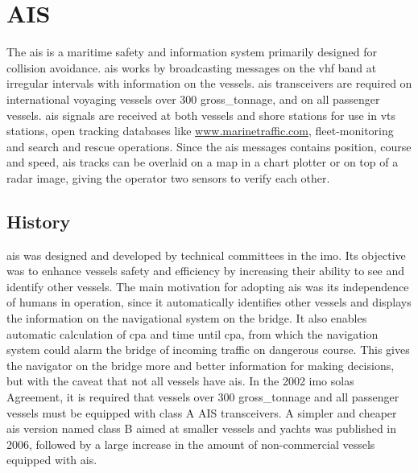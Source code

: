 \section{AIS}
The \acrfull{ais} is a maritime safety and information system primarily designed for collision avoidance. \gls{ais} works by broadcasting messages on the \gls{vhf} band at irregular intervals with information on the vessels. \gls{ais} transceivers are required on international voyaging vessels over 300 \gls{gross_tonnage}, and on all passenger vessels. \gls{ais} signals are received at both vessels and shore stations for use in \gls{vts} stations, open tracking databases like \url{www.marinetraffic.com}, fleet-monitoring and search and rescue operations. Since the \gls{ais} messages contains position, course and speed, \gls{ais} tracks can be overlaid on a map in a chart plotter or on top of a radar image, giving the operator two sensors to verify each other.

\subsection{History}
\gls{ais} was designed and developed by technical committees in the \gls{imo}. Its objective was to enhance vessels safety and efficiency by increasing their ability to see and identify other vessels. The main motivation for adopting \gls{ais} was its independence of humans in operation, since it automatically identifies other vessels and displays the information on the navigational system on the bridge. It also enables automatic calculation of \gls{cpa} and time until \gls{cpa}, from which the navigation system could alarm the bridge of incoming traffic on dangerous course. This gives the navigator on the bridge more and better information for making decisions, but with the caveat that not all vessels have \gls{ais}. In the 2002 \gls{imo} \gls{solas} Agreement, it is required that vessels over 300 \gls{gross_tonnage} and all passenger vessels must be equipped with class A AIS transceivers. A simpler and cheaper \gls{ais} version named class B aimed at smaller vessels and yachts was published in 2006, followed by a large increase in the amount of non-commercial vessels equipped with \gls{ais}.

